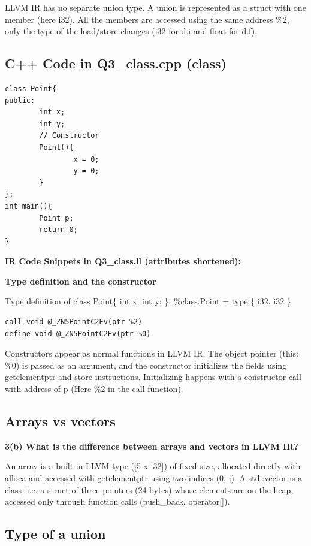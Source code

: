\documentclass[11pt,a4paper]{article}
\begin{document}
LLVM IR has no separate union type. A union is represented as a struct with one member (here i32). All the members are accessed using the same address \%2, only the type of the load/store changes (i32 for d.i and float for d.f).


\subsection{C++ Code in Q3\_class.cpp (class)}

\begin{lstlisting}
class Point{
public:
        int x;
        int y;
        // Constructor
        Point(){
                x = 0;
                y = 0;
        }
};
int main(){
        Point p;
        return 0;
}
\end{lstlisting}

\medskip\noindent\textbf{IR Code Snippets in Q3\_class.ll (attributes shortened):}\par\nopagebreak[4]

\textbf{Type definition and the constructor}

Type definition of class Point\{ int x; int y; \}: \%class.Point = type \{ i32, i32 \}

\begin{lstlisting}
call void @_ZN5PointC2Ev(ptr %2)
define void @_ZN5PointC2Ev(ptr %0)
\end{lstlisting}

Constructors appear as normal functions in LLVM IR. The object pointer (this: \%0) is passed as an argument, and the constructor initializes the fields using getelementptr and store instructions. Initializing happens with a constructor call with address of p (Here \%2 in the call function).

\subsection{Arrays vs vectors}

\textbf{3(b) What is the difference between arrays and vectors in LLVM IR?}

An array is a built-in LLVM type ([5 x i32]) of fixed size, allocated directly with alloca and accessed with getelementptr using two indices (0, i). A std::vector is a class, i.e. a struct of three pointers (24 bytes) whose elements are on the heap, accessed only through function calls (push\_back, operator[]).
\subsection{Type of a union}
\end{document}
